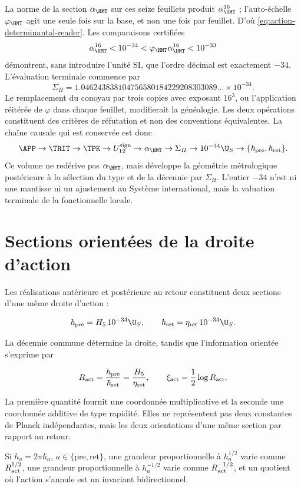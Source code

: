 La norme de la section \(\alpha_{\HMT}\) sur ces seize feuillets
produit \(\alpha_{\HMT}^{16}\) ; l'auto-échelle \(\varphi_{\HMT}\) agit
une seule fois sur la base, et non une fois par feuillet. D'où
\cref{eq:action-determinantal-reader}. Les comparaisons certifiées
\begin{equation}
\alpha_{\HMT}^{16}<10^{-34}
<\varphi_{\HMT}\alpha_{\HMT}^{16}<10^{-33}
\label{eq:action-decade-bounds}
\end{equation}
démontrent, sans introduire l'unité SI, que l'ordre décimal est
exactement \(-34\). L'évaluation terminale commence par
\begin{equation}
\Sigma_H
=1.046243838104756580184229208303089\ldots\times10^{-34}.
\label{eq:action-sigma-value}
\end{equation}
Le remplacement du conoyau par trois copies avec exposant \(16^3\), ou
l'application réitérée de \(\varphi\) dans chaque feuillet, modifierait la
généalogie. Les deux opérations constituent des critères de réfutation et non
des conventions équivalentes.
La chaîne causale qui est conservée est donc
\[
\APP\to\TRIT\to\TPK\to U_{12}^{\rm sign}
\to\alpha_{\HMT}\to\Sigma_H
\to10^{-34}\U_S\to
\{\hbar_{\rm pre},\hbar_{\rm ret}\}.
\]
Ce volume ne redérive pas \(\alpha_{\HMT}\), mais développe la géométrie
métrologique postérieure à la sélection du type et de la décennie par
\(\Sigma_H\). L'entier \(-34\) n'est ni une mantisse ni un ajustement au Système
international, mais la valuation terminale de la fonctionnelle locale.

\section{Sections orientées de la droite d'action}

Les réalisations antérieure et postérieure au retour constituent deux sections
d'une même droite d'action :

\begin{equation}
\hbar_{\rm pre}=H_5\,10^{-34}\U_S,\qquad
\hbar_{\rm ret}=\eta_{\rm ret}\,10^{-34}\U_S.
\label{eq:action-twoway}
\end{equation}

La décennie commune détermine la droite, tandis que l'information
orientée s'exprime par

\begin{equation}
R_{\rm act}=\frac{\hbar_{\rm pre}}{\hbar_{\rm ret}}
=\frac{H_5}{\eta_{\rm ret}},
\qquad
\xi_{\rm act}=\frac12\log R_{\rm act}.
\label{eq:action-rapidity}
\end{equation}

La première quantité fournit une coordonnée multiplicative et la seconde
une coordonnée additive de type rapidité. Elles ne représentent pas deux constantes de
Planck indépendantes, mais les deux orientations d'une même section
par rapport au retour.

Si \(h_a=2\pi\hbar_a\), \(a\in\{\mathrm{pre},\mathrm{ret}\}\), une grandeur proportionnelle à \(h_a^{1/2}\) varie comme \(R_{\rm act}^{1/2}\), une grandeur proportionnelle à \(h_a^{-1/2}\) varie comme \(R_{\rm act}^{-1/2}\), et un quotient où l'action s'annule est un invariant bidirectionnel.

